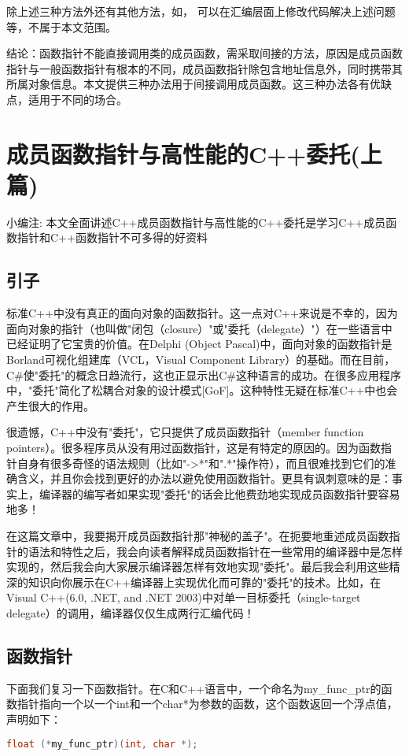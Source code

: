 \documentclass{article}
\begin{document}
\begin{CJK}{UTF8}{gbsn}
\begin{itemize}
\begin{itemize}
除上述三种方法外还有其他方法，如， 可以在汇编层面上修改代码解决上述问题等，不属于本文范围。

结论：函数指针不能直接调用类的成员函数，需采取间接的方法，原因是成员函数指针与一般函数指针有根本的不同，成员函数指针除包含地址信息外，同时携带其所属对象信息。本文提供三种办法用于间接调用成员函数。这三种办法各有优缺点，适用于不同的场合。
\end{itemize}
\end{itemize}


\section{成员函数指针与高性能的C++委托(上篇)}
小编注: 本文全面讲述C++成员函数指针与高性能的C++委托是学习C++成员函数指针和C++函数指针不可多得的好资料

\subsection{引子 }
标准C++中没有真正的面向对象的函数指针。这一点对C++来说是不幸的，因为面向对象的指针（也叫做"闭包（closure）"或"委托（delegate）"）在一些语言中已经证明了它宝贵的价值。在Delphi (Object Pascal)中，面向对象的函数指针是Borland可视化组建库（VCL，Visual Component Library）的基础。而在目前，C\#使"委托"的概念日趋流行，这也正显示出C\#这种语言的成功。在很多应用程序中，"委托"简化了松耦合对象的设计模式[GoF]。这种特性无疑在标准C++中也会产生很大的作用。

很遗憾，C++中没有"委托"，它只提供了成员函数指针（member function pointers）。很多程序员从没有用过函数指针，这是有特定的原因的。因为函数指针自身有很多奇怪的语法规则（比如"->*"和".*"操作符），而且很难找到它们的准确含义，并且你会找到更好的办法以避免使用函数指针。更具有讽刺意味的是：事实上，编译器的编写者如果实现"委托"的话会比他费劲地实现成员函数指针要容易地多！

在这篇文章中，我要揭开成员函数指针那"神秘的盖子"。在扼要地重述成员函数指针的语法和特性之后，我会向读者解释成员函数指针在一些常用的编译器中是怎样实现的，然后我会向大家展示编译器怎样有效地实现"委托"。最后我会利用这些精深的知识向你展示在C++编译器上实现优化而可靠的"委托"的技术。比如，在Visual C++(6.0, .NET, and .NET 2003)中对单一目标委托（single-target delegate）的调用，编译器仅仅生成两行汇编代码！

\subsection{函数指针}
下面我们复习一下函数指针。在C和C++语言中，一个命名为my\_func\_ptr的函数指针指向一个以一个int和一个char*为参数的函数，这个函数返回一个浮点值，声明如下：
\begin{lstlisting}[language=c++]
float (*my_func_ptr)(int, char *);


\end{lstlisting}
\end{CJK}
\end{document}
